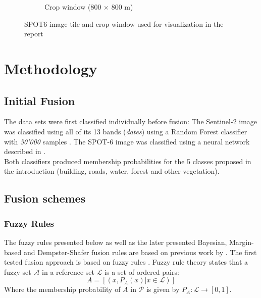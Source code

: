 \documentclass[10pt]{article}
\begin{document}
\begin{figure}[H]
\begin{subfigure}{0.49\textwidth}
        \caption{Crop window (800 $\times$ 800 m)}
        \label{fig:areaSmall}
    \end{subfigure}
    \caption{SPOT6 image tile and crop window used for visualization in the report}
    \label{fig:area}
    \centering
\end{figure}

\section{Methodology}\label{sec:method}
\subsection{Initial Fusion}

The data sets were first classified individually before fusion: The Sentinel-2 image was classified using all of its 13 bands (\textit{dates}) using a Random Forest classifier with \textit{50'000} samples \parencite{puissant_object-oriented_2014}. The SPOT-6 image was classified using a neural network described in \cite{postadjian_investigating_2017}.\\
Both classifiers produced membership probabilities for the 5 classes proposed in the introduction (building, roads, water, forest and other vegetation).

\subsection{Fusion schemes}\label{sec:fusion}

\subsubsection{Fuzzy Rules}\label{sec:fuzzyLogic}
The fuzzy rules presented below as well as the later presented Bayesian, Margin-based and Dempster-Shafer fusion rules are based on previous work by \cite{ouerghemmi_two-step_2017}. The first tested fusion approach is based on fuzzy rules \cite{zadeh_fuzzy_1965}. Fuzzy rule theory states that a fuzzy set $\mathcal{A}$ in a reference set $\mathcal{L}$ is a set of ordered pairs:
\begin{equation}
    A=[(x,P_A(x)|x\in \mathcal{L})]
\end{equation}
Where the membership probability of $A$ in $\mathcal{P}$ is given by $P_A:\mathcal{L}\rightarrow[0,1]$.
\end{document}
